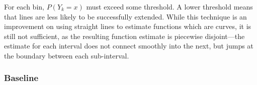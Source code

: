 \documentclass[11pt]{article}
\begin{document}
    For each bin, $P(Y_k=x)$ must exceed some threshold. A lower threshold means
    that lines are less likely to be successfully extended. While this technique
    is an improvement on using straight lines to estimate functions which are
    curves, it is still not sufficient, as the resulting function estimate is
    piecewise disjoint---the estimate for each interval does not connect
    smoothly into the next, but jumps at the boundary between each sub-interval.

\subsubsection{Baseline}
\label{sec-4.1.2}
\end{document}
